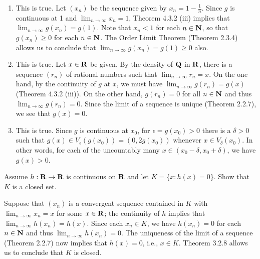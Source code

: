 \documentclass{lew98_solutions}
\begin{document}
\begin{solution}
    \begin{enumerate}
        \item This is true. Let \( (x_n) \) be the sequence given by \( x_n = 1 - \tfrac{1}{n} \). Since \( g \) is continuous at 1 and \( \lim_{n \to \infty} x_n = 1 \), Theorem 4.3.2 (iii) implies that \( \lim_{n \to \infty} g(x_n) = g(1) \). Note that \( x_n < 1 \) for each \( n \in \mathbf{N} \), so that \( g(x_n) \geq 0 \) for each \( n \in \mathbf{N} \). The Order Limit Theorem (Theorem 2.3.4) allows us to conclude that \( \lim_{n \to \infty} g(x_n) = g(1) \geq 0 \) also.

        \item This is true. Let \( x \in \mathbf{R} \) be given. By the density of \( \mathbf{Q} \) in \( \mathbf{R} \), there is a sequence \( (r_n) \) of rational numbers such that \( \lim_{n \to \infty} r_n = x \). On the one hand, by the continuity of \( g \) at \( x \), we must have \( \lim_{n \to \infty} g(r_n) = g(x) \) (Theorem 4.3.2 (iii)). On the other hand, \( g(r_n) = 0 \) for all \( n \in \mathbf{N} \) and thus \( \lim_{n \to \infty} g(r_n) = 0 \). Since the limit of a sequence is unique (Theorem 2.2.7), we see that \( g(x) = 0 \).
        
        \item This is true. Since \( g \) is continuous at \( x_0 \), for \( \epsilon = g(x_0) > 0 \) there is a \( \delta > 0 \) such that \( g(x) \in V_{\epsilon}(g(x_0)) = (0, 2 g(x_0)) \) whenever \( x \in V_{\delta}(x_0) \). In other words, for each of the uncountably many \( x \in (x_0 - \delta, x_0 + \delta) \), we have \( g(x) > 0 \).
    \end{enumerate}
\end{solution}

\begin{exercise}
\label{ex:4.3.9}
    Assume \( h : \mathbf{R} \to \mathbf{R} \) is continuous on \( \mathbf{R} \) and let \( K = \{ x : h(x) = 0 \} \). Show that \( K \) is a closed set.
\end{exercise}

\begin{solution}
    Suppose that \( (x_n) \) is a convergent sequence contained in \( K \) with \( \lim_{n \to \infty} x_n = x \) for some \( x \in \mathbf{R} \); the continuity of \( h \) implies that \( \lim_{n \to \infty} h(x_n) = h(x) \). Since each \( x_n \in K \), we have \( h(x_n) = 0 \) for each \( n \in \mathbf{N} \) and thus \( \lim_{n \to \infty} h(x_n) = 0 \). The uniqueness of the limit of a sequence (Theorem 2.2.7) now implies that \( h(x) = 0 \), i.e., \( x \in K \). Theorem 3.2.8 allows us to conclude that \( K \) is closed.
\end{solution}
\end{document}
